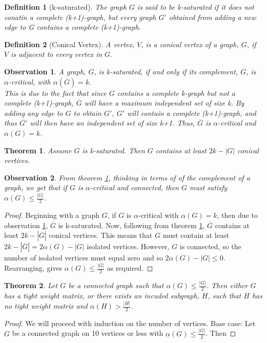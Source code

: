 \documentclass[12pt]{article}
\theoremstyle{parenbold}
\newtheorem{definition}{Definition}[section]
\newtheorem{observation}{Observation}[section]
\newtheorem{theorem}{Theorem}[section]
\begin{document}
\begin{definition}[k-saturated]
The graph $G$ is said to be k-saturated if it does not conatin a complete (k+1)-graph, but every graph $G'$ obtained from adding a new edge to G contains a complete (k+1)-graph. \cite{kSaturated}
\end{definition}

\begin{definition}[Conical Vertex]
A vertex, $V$, is a conical vertex of a graph, $G$, if $V$ is adjacent to every vertex in $G$.
\end{definition}


\begin{observation} \label{obs-sat}
A graph, $G$, is k-saturated, if and only if its complement, $\overline{G}$, is $\alpha$-critical, with $\alpha(\overline{G})=k$. \\
This is due to the fact that since $G$ contains a complete k-graph but not a complete (k+1)-graph, $\overline{G}$ will have a maximum independent set of size k. By adding any edge to $G$ to obtain $G'$, $G'$ will contain a complete (k+1)-graph, and thus $\overline{G'}$ will then have an independent set of size k+1. Thus, $\overline{G}$ is $\alpha$-critical and $\alpha(G)=k$.
\end{observation}

\begin{theorem} \label{k-sat}
Assume $G$ is k-saturated. Then $G$ contains at least $2k - |G|$ conical vertices. \cite{kSaturated}
\end{theorem}

\begin{observation}
From theorem \ref{k-sat}, thinking in terms of of the complement of a graph, we get that if $G$ is $\alpha$-critical and connected, then $G$ must satisfy $\alpha(G) \leq \frac{|G|}{2}$.
\end{observation}

\begin{proof}
Beginning with a graph $G$, if $G$ is $\alpha$-critical with $\alpha(G)=k$, then due to observation \ref{obs-sat}, $\overline{G}$ is k-saturated. Now, following from theorem \ref{k-sat}, $\overline{G}$ contains at least $2k - |\overline{G}|$ conical vertices. This means that $G$ must contain at least $2k - |\overline{G}| = 2\alpha(G) - |G|$ isolated vertices. However, $G$ is connected, so the number of isolated vertices must equal zero and so $2\alpha(G) - |G| \leq 0$. Rearranging, gives $\alpha(G) \leq \frac{|G|}{2}$ as required.
\end{proof}

\begin{theorem}
Let $G$ be a connected graph such that $\alpha(G) \leq \frac{|G|}{2}$. Then either $G$ has a tight weight matrix, or there exists an incuded subgraph, $H$, such that $H$ has no tight weight matrix and $\alpha(H) > \frac{|H|}{2}$.
\end{theorem}

\begin{proof}
We will proceed with induction on the number of vertices.
Base case: Let $G$ be a connected graph on 10 vertices or less with $\alpha(G) \leq \frac{|G|}{2}$. Then 
\end{proof}



\end{document}
